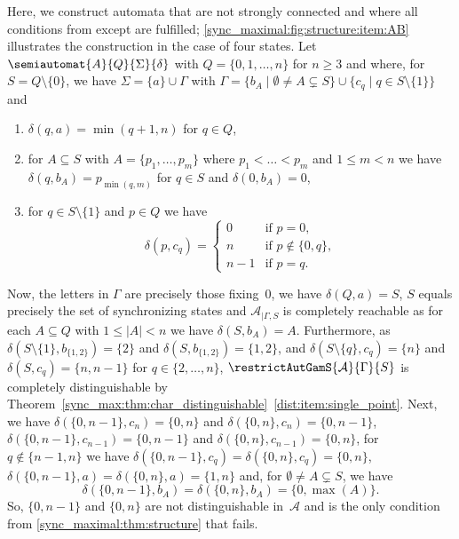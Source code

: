 \begin{example} \label{sync_maximal:ex:structure:item:AB}
	Here, we construct automata that are not strongly connected and where all conditions
	from 
	except 
	are fulfilled; \cref{sync_maximal:fig:structure:item:AB} illustrates the construction in the case of four states.	
	Let $\semiautomat{A}{Q}{\Sigma}{\delta}$ with $Q = \{0,1,\ldots,n\}$ for $n \ge 3$ and where, for $S = Q \setminus \{0\}$,	we have $\Sigma = \{a\} \cup \Gamma$ with $\Gamma = \{ b_A \mid \emptyset \ne A \subsetneq S \} \cup \{ c_q \mid q \in S \setminus \{1\}\}$ and
	\begin{enumerate}
		\item $\delta(q, a) = \min(q+1,n)$ for $q \in Q$,
		\item for $A \subseteq S$ with $A = \{p_1, \ldots, p_m\}$ where $p_1 < \ldots < p_m$ and $1 \le m < n$
		we have $\delta(q, b_A) = p_{\min(q, m)}$ for $q \in S$
		and $\delta(0, b_A) = 0$,
		\item for $q \in S \setminus \{1\}$ and $p \in Q$ we have
		\[
		\delta(p, c_q)
		=
		\begin{cases}
			0     & \text{if } p = 0, \\
			n     & \text{if } p \notin \{0,q\}, \\
			n - 1 & \text{if } p = q. 	
		\end{cases}
		\]
	\end{enumerate}
	Now, the letters in $\Gamma$ are precisely those fixing~$0$, we have	$\delta(Q, a) = S$, $S$ equals precisely the set of synchronizing states and $\mathcal A_{|\Gamma, S}$ is completely reachable as for each $A \subseteq Q$ with $1 \le |A| < n$ we have $\delta(S, b_A) = A$. Furthermore, as $\delta(S \setminus \{1\}, b_{\{1,2\}}) = \{2\}$ and $\delta(S, b_{\{1,2\}}) = \{1,2\}$, and $\delta(S \setminus \{q\}, c_q) = \{n\}$	and $\delta(S, c_q) = \{n, n-1\}$ for $q \in \{2,\ldots,n\}$, 
	$\restrictAutGamS{\mathcal A}{\Gamma}{S}$ is completely distinguishable	by Theorem~\ref{sync_max:thm:char_distinguishable}~\ref{dist:item:single_point}. Next, we have	$\delta(\{0,n-1\}, c_n) = \{0,n\}$ and $\delta(\{0,n\}, c_n)  = \{0,n-1\}$, $\delta(\{0,n-1\}, c_{n-1})  = \{0,n-1\}$ and $\delta(\{0,n\}, c_{n-1})  = \{0,n\}$, for $q \notin \{n-1,n\}$
	we have $\delta(\{0,n-1\}, c_q) = \delta(\{0,n\}, c_q) = \{0,n\}$, $\delta(\{0,n-1\}, a)  = \delta(\{0,n\}, a) = \{1,n\}$	and, for $\emptyset \ne A \subsetneq S$, we have
	\[
	\delta(\{0,n-1\}, b_A) = \delta(\{0,n\}, b_A) = \{0,\max(A)\}.
	\]
	So, $\{0,n-1\}$ and $\{0,n\}$ are not distinguishable in~$\mathcal A$ and  is the only condition from \cref{sync_maximal:thm:structure} that fails.	
	

\end{example}
